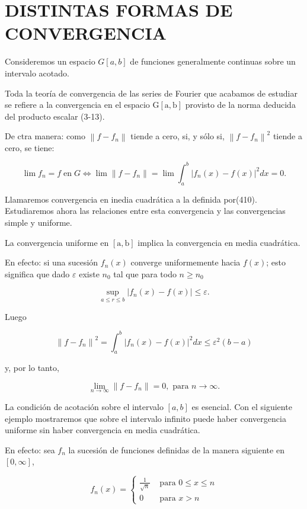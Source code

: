 \documentclass[10pt]{article}
\theoremstyle{plain}
\theoremstyle{definition}
\theoremstyle{remark}
\begin{document}
\section*{DISTINTAS FORMAS DE CONVERGENCIA}
Consideremos un espacio $G[a, b]$ de funciones generalmente continuas sobre un intervalo acotado.

Toda la teoría de convergencia de las series de Fourier que acabamos de estudiar se refiere a la convergencia en el espacio $\mathrm{G}[\mathrm{a}, \mathrm{b}]$ provisto de la norma deducida del producto escalar (3-13).

De ctra manera: como $\left\|f-f_{n}\right\|$ tiende a cero, si, y sólo si, $\left\|f-f_{n}\right\|^{2}$ tiende a cero, se tiene:


\begin{equation*}
\lim f_{n}=f \operatorname{en} G \Longleftrightarrow \lim \left\|f-f_{n}\right\|=\lim \int_{a}^{b}\left|f_{n}(x)-f(x)\right|^{2} d x=0 . \tag{4-10}
\end{equation*}


Llamaremos convergencia en inedia cuadrática a la definida por(410).\\
Estudiaremos ahora las relaciones entre esta convergencia y las convergencias simple y uniforme.

La convergencia uniforme en $[\mathrm{a}, \mathrm{b}]$ implica la convergencia en media cuadrática.

En efecto: si una sucesión $f_{n}(x)$ converge uniformemente hacia $f(x)$; esto significa que dado $\varepsilon$ existe $n_{0}$ tal que para todo $n \geqslant n_{0}$

$$
\sup _{a \leqslant r \leqslant b}\left|f_{n}(x)-f(x)\right| \leqslant \varepsilon .
$$

Luego

$$
\left\|f-f_{n}\right\|^{2}=\int_{a}^{b}\left|f_{n}(x)-f(x)\right|^{2} d x \leqslant \varepsilon^{2}(b-a)
$$

y, por lo tanto,

$$
\lim _{n \rightarrow \infty}\left\|f-f_{n}\right\|=0, \text { para } n \rightarrow \infty .
$$

La condición de acotación sobre el intervalo $[a, b]$ es esencial. Con el siguiente ejemplo mostraremos que sobre el intervalo infinito puede haber convergencia uniforme sin haber convergencia en media cuadrática.

En efecto: sea $f_{n}$ la sucesión de funciones definidas de la manera siguiente en $[0, \infty]$,

$$
f_{n}(x)=\left\{\begin{array}{cc}
\frac{1}{\sqrt{n}} & \text { para } 0 \leqslant x \leqslant n \\
0 & \text { para } x>n
\end{array}\right.
$$
\end{document}
